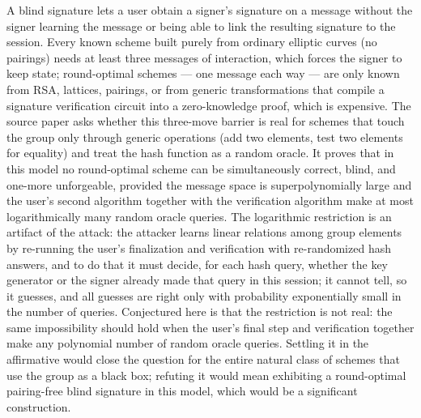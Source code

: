\documentclass{aicr-conjecture}
\begin{document}

\vspace{0.4em}

\begin{informalconjecture}
A blind signature lets a user obtain a signer's signature on a message
without the signer learning the message or being able to link the
resulting signature to the session. Every known scheme built purely
from ordinary elliptic curves (no pairings) needs at least three
messages of interaction, which forces the signer to keep state;
round-optimal schemes --- one message each way --- are only known from
RSA, lattices, pairings, or from generic transformations that compile a
signature verification circuit into a zero-knowledge proof, which is
expensive. The source paper asks whether this three-move barrier is
real for schemes that touch the group only through generic operations
(add two elements, test two elements for equality) and treat the hash
function as a random oracle. It proves that in this model no
round-optimal scheme can be simultaneously correct, blind, and one-more
unforgeable, provided the message space is superpolynomially large and
the user's second algorithm together with the verification algorithm
make at most logarithmically many random oracle queries. The
logarithmic restriction is an artifact of the attack: the attacker
learns linear relations among group elements by re-running the user's
finalization and verification with re-randomized hash answers, and to
do that it must decide, for each hash query, whether the key generator
or the signer already made that query in this session; it cannot tell,
so it guesses, and all guesses are right only with probability
exponentially small in the number of queries. Conjectured here is that
the restriction is not real: the same impossibility should hold when
the user's final step and verification together make any polynomial
number of random oracle queries. Settling it in the affirmative would
close the question for the entire natural class of schemes that use the
group as a black box; refuting it would mean exhibiting a round-optimal
pairing-free blind signature in this model, which would be a
significant construction.
\end{informalconjecture}
\end{document}
